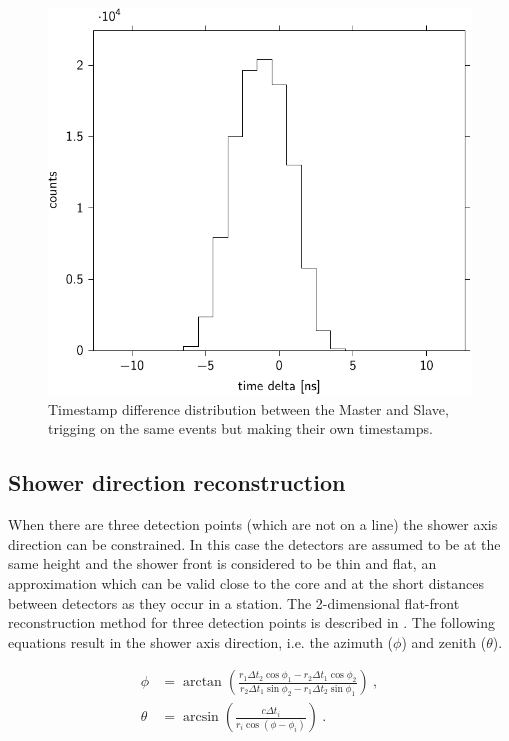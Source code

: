 \begin{figure}
    \centering
    \includegraphics{plots/station/time_delta_501}
    \caption{Timestamp difference distribution between the Master and Slave, trigging on the same events but making their own timestamps.}
    \label{fig:time_delta_501}
\end{figure}


\subsection{Shower direction reconstruction}

When there are three detection points (which are not on a line) the shower axis direction can be constrained. In this case the detectors are assumed to be at the same height and the shower front is considered to be thin and flat, an approximation which can be valid close to the core and at the short distances between detectors as they occur in a station. The 2-dimensional flat-front reconstruction method for three detection points is described in \cite{fokkema2012hisparc}. The following equations result in the shower axis direction, i.e. the azimuth ($\phi$) and zenith ($\theta$).

\begin{equation}
    \label{eq:direction-2dflat}
    \begin{split}
        \phi &= \arctan \left(\frac{r_1 \Delta t_2 \cos \phi_1 - r_2 \Delta t_1 \cos \phi_2}{r_2 \Delta t_1 \sin \phi_2 - r_1 \Delta t_2 \sin \phi_1} \right) \ , \\
        \theta &= \arcsin \left(\frac{c \Delta t_i}{r_i \cos(\phi - \phi_i)} \right) \ .
    \end{split}
\end{equation}


